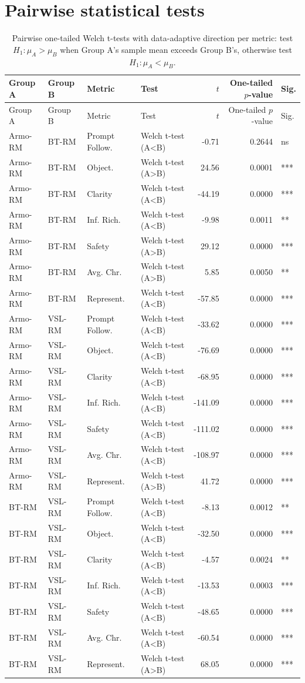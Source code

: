 \documentclass{article}
\begin{document}
\section*{Pairwise statistical tests}

\begin{longtable}{llllrrl}
\caption{Pairwise one-tailed Welch t-tests with data-adaptive direction per metric: test $H_1: \mu_{A} > \mu_{B}$ when Group A's sample mean exceeds Group B's, otherwise test $H_1: \mu_{A} < \mu_{B}$.}\label{tab:pairwise-tests}\\
\toprule
Group A & Group B & Metric & Test & $t$ & One-tailed $p$-value & Sig. \\
\midrule
\endfirsthead
\toprule
Group A & Group B & Metric & Test & $t$ & One-tailed $p$-value & Sig. \\
\midrule
\endhead
\bottomrule
\endfoot
Armo-RM & BT-RM & Prompt Follow. & Welch t-test (A<B) & -0.71 & 0.2644 & ns \\
Armo-RM & BT-RM & Object. & Welch t-test (A>B) & 24.56 & 0.0001 & *** \\
Armo-RM & BT-RM & Clarity & Welch t-test (A<B) & -44.19 & 0.0000 & *** \\
Armo-RM & BT-RM & Inf. Rich. & Welch t-test (A<B) & -9.98 & 0.0011 & ** \\
Armo-RM & BT-RM & Safety & Welch t-test (A>B) & 29.12 & 0.0000 & *** \\
Armo-RM & BT-RM & Avg. Chr. & Welch t-test (A>B) & 5.85 & 0.0050 & ** \\
Armo-RM & BT-RM & Represent. & Welch t-test (A<B) & -57.85 & 0.0000 & *** \\
Armo-RM & VSL-RM & Prompt Follow. & Welch t-test (A<B) & -33.62 & 0.0000 & *** \\
Armo-RM & VSL-RM & Object. & Welch t-test (A<B) & -76.69 & 0.0000 & *** \\
Armo-RM & VSL-RM & Clarity & Welch t-test (A<B) & -68.95 & 0.0000 & *** \\
Armo-RM & VSL-RM & Inf. Rich. & Welch t-test (A<B) & -141.09 & 0.0000 & *** \\
Armo-RM & VSL-RM & Safety & Welch t-test (A<B) & -111.02 & 0.0000 & *** \\
Armo-RM & VSL-RM & Avg. Chr. & Welch t-test (A<B) & -108.97 & 0.0000 & *** \\
Armo-RM & VSL-RM & Represent. & Welch t-test (A>B) & 41.72 & 0.0000 & *** \\
BT-RM & VSL-RM & Prompt Follow. & Welch t-test (A<B) & -8.13 & 0.0012 & ** \\
BT-RM & VSL-RM & Object. & Welch t-test (A<B) & -32.50 & 0.0000 & *** \\
BT-RM & VSL-RM & Clarity & Welch t-test (A<B) & -4.57 & 0.0024 & ** \\
BT-RM & VSL-RM & Inf. Rich. & Welch t-test (A<B) & -13.53 & 0.0003 & *** \\
BT-RM & VSL-RM & Safety & Welch t-test (A<B) & -48.65 & 0.0000 & *** \\
BT-RM & VSL-RM & Avg. Chr. & Welch t-test (A<B) & -60.54 & 0.0000 & *** \\
BT-RM & VSL-RM & Represent. & Welch t-test (A>B) & 68.05 & 0.0000 & *** \\
\end{longtable}
\end{document}

